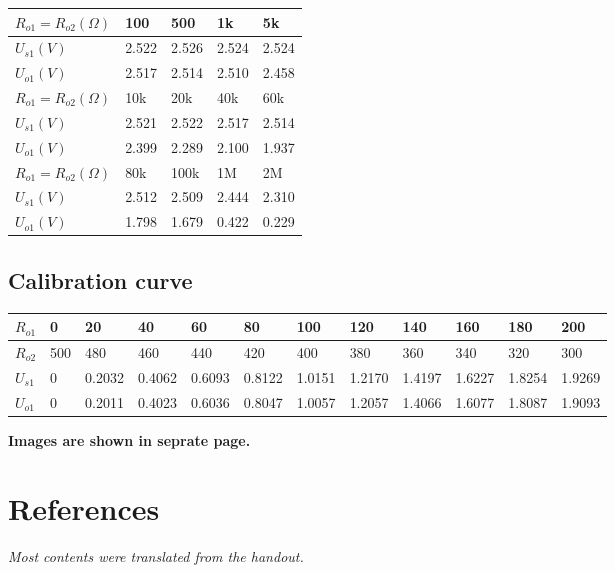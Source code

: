 \documentclass[a4paper]{article}
\begin{document}
\begin{multicols*}{2}
    \begin{tabular}{l|l|l|l|l}
        $R_{o1}=R_{o2}(\Omega)$ & 100   & 500   & 1k    & 5k    \\\hline
        $U_{s1}(V)$             & 2.522 & 2.526 & 2.524 & 2.524 \\
        $U_{o1}(V)$             & 2.517 & 2.514 & 2.510 & 2.458 \\\hline
        $R_{o1}=R_{o2}(\Omega)$ & 10k   & 20k   & 40k   & 60k   \\\hline
        $U_{s1}(V)$             & 2.521 & 2.522 & 2.517 & 2.514 \\
        $U_{o1}(V)$             & 2.399 & 2.289 & 2.100 & 1.937 \\\hline
        $R_{o1}=R_{o2}(\Omega)$ & 80k   & 100k  & 1M    & 2M    \\\hline
        $U_{s1}(V)$             & 2.512 & 2.509 & 2.444 & 2.310 \\
        $U_{o1}(V)$             & 1.798 & 1.679 & 0.422 & 0.229 \\
    \end{tabular}

    \subsection*{Calibration curve}

    \begin{tabular}{l|l|l|l|l|l|l|l|l|l|l|l}
        $R_{o1}$ & 0   & 20     & 40     & 60     & 80     & 100    & 120    & 140    & 160    & 180    & 200    \\\hline
        $R_{o2}$ & 500 & 480    & 460    & 440    & 420    & 400    & 380    & 360    & 340    & 320    & 300    \\\hline
        $U_{s1}$ & 0   & 0.2032 & 0.4062 & 0.6093 & 0.8122 & 1.0151 & 1.2170 & 1.4197 & 1.6227 & 1.8254 & 1.9269 \\
        $U_{o1}$ & 0   & 0.2011 & 0.4023 & 0.6036 & 0.8047 & 1.0057 & 1.2057 & 1.4066 & 1.6077 & 1.8087 & 1.9093
    \end{tabular}

    \par*
    \textbf{Images are shown in seprate page.}
    \columnbreak

    \section*{References}
    \textit{Most contents were translated from the handout.}


\end{multicols*}
\end{document}
